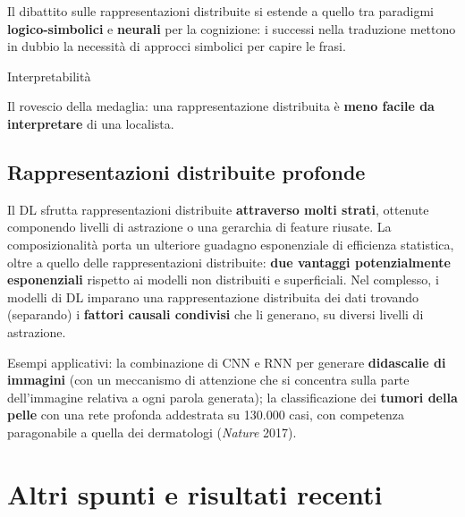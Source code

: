 Il dibattito sulle rappresentazioni distribuite si estende a quello tra
paradigmi \textbf{logico-simbolici} e \textbf{neurali} per la
cognizione: i successi nella traduzione mettono in dubbio la necessità
di approcci simbolici per capire le frasi.

\begin{boxwarning}{Interpretabilità}

Il rovescio della medaglia: una rappresentazione distribuita è
\textbf{meno facile da interpretare} di una localista.

\end{boxwarning}

\subsection{Rappresentazioni distribuite
profonde}\label{rappresentazioni-distribuite-profonde}

Il DL sfrutta rappresentazioni distribuite \textbf{attraverso molti
strati}, ottenute componendo livelli di astrazione o una gerarchia di
feature riusate. La composizionalità porta un ulteriore guadagno
esponenziale di efficienza statistica, oltre a quello delle
rappresentazioni distribuite: \textbf{due vantaggi potenzialmente
esponenziali} rispetto ai modelli non distribuiti e superficiali. Nel
complesso, i modelli di DL imparano una rappresentazione distribuita dei
dati trovando (separando) i \textbf{fattori causali condivisi} che li
generano, su diversi livelli di astrazione.

Esempi applicativi: la combinazione di CNN e RNN per generare
\textbf{didascalie di immagini} (con un meccanismo di attenzione che si
concentra sulla parte dell'immagine relativa a ogni parola generata); la
classificazione dei \textbf{tumori della pelle} con una rete profonda
addestrata su 130.000 casi, con competenza paragonabile a quella dei
dermatologi (\emph{Nature} 2017).

\section{Altri spunti e risultati
recenti}\label{altri-spunti-e-risultati-recenti}

